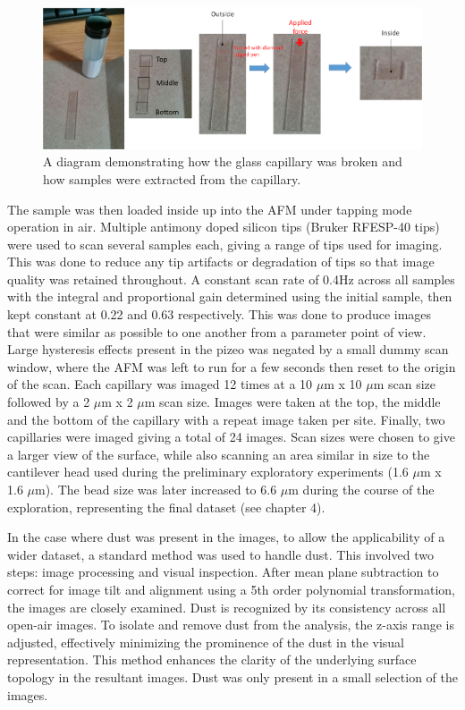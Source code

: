 \begin{figure}[h]     %
        \begin{center}
          \includegraphics[width=120mm]{chapter3/Figure8.png}
\end{center}
\caption{A diagram demonstrating how the glass capillary was broken and how samples were extracted from the capillary.}
\label{fig:figure8}                 %
\end{figure}   


The sample was then loaded inside up into the AFM under tapping mode operation in air. Multiple antimony doped silicon tips (Bruker RFESP-40 tips) were used to scan several samples each, giving a range of tips used for imaging. This was done to reduce any tip artifacts or degradation of tips so that image quality was retained throughout. A constant scan rate of 0.4Hz across all samples with the integral and proportional gain determined using the initial sample, then kept constant at 0.22 and 0.63 respectively. This was done to produce images that were similar as possible to one another from a parameter point of view. Large hysteresis effects present in the pizeo was negated by a small dummy scan window, where the AFM was left to run for a few seconds then reset to the origin of the scan. Each capillary was imaged 12 times at a 10 $\mu$m x 10 $\mu$m scan size followed by a 2 $\mu$m x 2 $\mu$m scan size. Images were taken at the top, the middle and the bottom of the capillary with a repeat image taken per site. Finally, two capillaries were imaged giving a total of 24 images. Scan sizes were chosen to give a larger view of the surface, while also scanning an area similar in size to the cantilever head used during the preliminary exploratory experiments (1.6 $\mu$m x 1.6 $\mu$m). The bead size was later increased to 6.6 $\mu$m during the course of the exploration, representing the final dataset (see chapter 4). 

In the case where dust was present in the images, to allow the applicability of a wider dataset, a standard method was used to handle dust. This involved two steps: image processing and visual inspection. After mean plane subtraction to correct for image tilt and alignment using a 5th order polynomial transformation, the images are closely examined. Dust is recognized by its consistency across all open-air images. To isolate and remove dust from the analysis, the z-axis range is adjusted, effectively minimizing the prominence of the dust in the visual representation. This method enhances the clarity of the underlying surface topology in the resultant images. Dust was only present in a small selection of the images.

